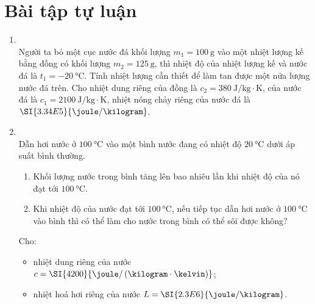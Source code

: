 \section{Bài tập tự luận}
\begin{enumerate}[label=\bfseries Câu \arabic*:, leftmargin=1.7cm]
	\item {}\\
	Người ta bỏ một cục nước đá khối lượng $m_1=\SI{100}{\gram}$ vào một nhiệt lượng kế bằng đồng có khối lượng $m_2=\SI{125}{\gram}$, thì nhiệt độ của nhiệt lượng kế và nước đá là $t_1=\SI{-20}{\celsius}$. Tính nhiệt lượng cần thiết để làm tan được một nửa lượng nước đá trên. Cho nhiệt dung riêng của đồng là $c_2=\SI{380}{\joule/\kilogram\cdot\kelvin}$, của nước đá là $c_1=\SI{2100}{\joule/\kilogram\cdot\kelvin}$, nhiệt nóng chảy riêng của nước đá là $\SI{3.34E5}{\joule/\kilogram}$.

\item {}\\
Dẫn hơi nước ở $\SI{100}{\celsius}$ vào một bình nước đang có nhiệt độ $\SI{20}{\celsius}$ dưới áp suất bình thường.
\begin{enumerate}[label=\alph*)]
	\item Khối lượng nước trong bình tăng lên bao nhiêu lần khi nhiệt độ của nó đạt tới $\SI{100}{\celsius}$.
	\item Khi nhiệt độ của nước đạt tới $\SI{100}{\celsius}$, nếu tiếp tục dẫn hơi nước ở $\SI{100}{\celsius}$ vào bình thì có thể làm cho nước trong bình có thể sôi được không?
\end{enumerate}
Cho:
\begin{itemize}
	\item nhiệt dung riêng của nước $c=\SI{4200}{\joule/\left(\kilogram\cdot\kelvin\right)}$;
	\item nhiệt hoá hơi riêng của nước $L=\SI{2.3E6}{\joule/\kilogram}$.
\end{itemize}


\end{enumerate}
